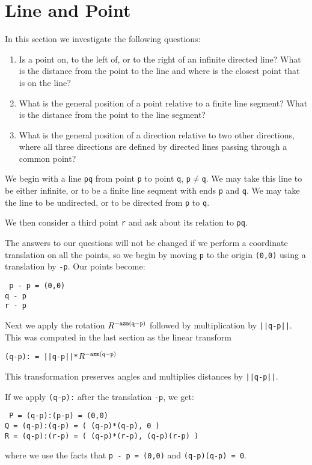\documentclass[12pt]{article}
\begin{document}
\newpage

\section{Line and Point}\label{LINE-AND-POINT}
In this section we investigate the following questions:
\begin{enumerate}
\item Is a point on, to the left of, or to the right of
an infinite directed line?  What is the distance from the
point to the line and where is the closest point that is
on the line?
\item What is the general position of a point relative
to a finite line segment?  What is the distance from the
point to the line segment?
\item What is the general position of a direction relative
to two other directions, where all three directions are
defined by directed lines passing through a common point?
\end{enumerate}

We begin with a line {\tt pq} from point {\tt p} to point {\tt q},
{\tt p$\neq$q}.
We may take this line to be either infinite, or to be a finite
line seqment with ends {\tt p} and {\tt q}.  We may take the
line to be undirected, or to be directed from {\tt p} to {\tt q}.

We then consider a third point {\tt r} and ask about its relation
to {\tt pq}.

The answers to our questions will not be changed if we perform
a coordinate translation on all the points, so we begin by moving
{\tt p} to the origin {\tt (0,0)} using a translation by {\tt -p}.
Our points become:
\begin{center} \tt
p - p = (0,0) \\
q - p \\
r - p
\end{center}
Next we apply the rotation $R^{\tt -azm(q-p)}$
followed by multiplication by {\tt ||q-p||}.  This was computed
in the last section as the linear transform \\
\centerline{\tt (q-p): = ||q-p||*$R^{\tt -azm(q-p)}$}
This transformation preserves angles and multiplies distances by {\tt ||q-p||}.

If we apply {\tt (q-p):} after the translation {\tt -p}, we get:
\begin{center} \tt
P = (q-p):(p-p) = (0,0) \\
Q = (q-p):(q-p) = ( (q-p)*(q-p), 0 ) \\
R = (q-p):(r-p) = ( (q-p)*(r-p), (q-p)\WH(r-p) )
\end{center}
where we use the facts that {\tt p - p = (0,0)} and
{\tt (q-p)\WH(q-p) = 0}.
\end{document}
